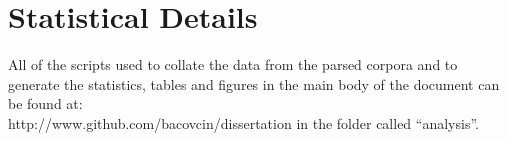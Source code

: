 \chapter{Statistical Details}
\label{app:stats}

All of the scripts used to collate the data from the parsed corpora and to generate the statistics, tables and figures in the main body of the document can be found at:\\ http://www.github.com/bacovcin/dissertation in the folder called ``analysis''.
